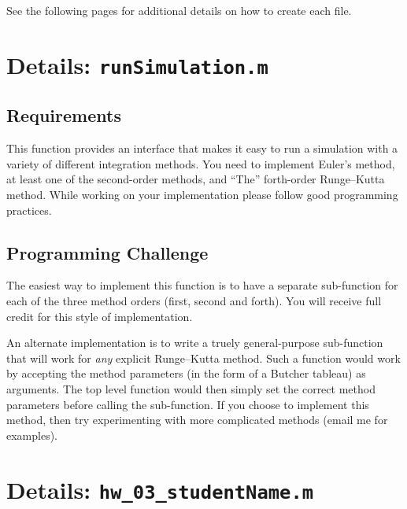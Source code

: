 See the following pages for additional details on how to create each file.

\pagebreak

\section*{Details: \texttt{runSimulation.m}}



\subsection*{Requirements}

This function provides an interface that makes it easy to run a simulation
with a variety of different integration methods.
You need to implement Euler's method,
at least one of the second-order methods,
and ``The'' forth-order Runge--Kutta method.
While working on your implementation please follow good programming practices.

\subsection*{Programming Challenge}

The easiest way to implement this function is to have a separate sub-function
for each of the three method orders (first, second and forth).
You will receive full credit for this style of implementation.

\par
An alternate implementation is to write a truely general-purpose sub-function
that will work for \textit{any} explicit Runge--Kutta method. Such a function
would work by accepting the method parameters (in the form of a Butcher tableau)
as arguments. The top level function would then simply set the correct method
parameters before calling the sub-function.
If you choose to implement this method, then try experimenting with more
complicated methods (email me for examples).

\pagebreak

\section*{Details: \texttt{hw\_03\_studentName.m}}



